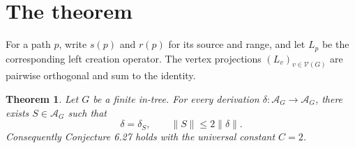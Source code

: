 \documentclass[11pt]{article}
\newtheorem{theorem}{Theorem}
\newcommand{\A}{\mathcal A}
\newcommand{\V}{\mathcal V}
\begin{document}
\section{The theorem}

For a path $p$, write $s(p)$ and $r(p)$ for its source and range, and let
$L_p$ be the corresponding left creation operator.  The vertex projections
$(L_v)_{v\in\V(G)}$ are pairwise orthogonal and sum to the identity.

\begin{theorem}\label{thm:main}
Let $G$ be a finite in-tree.  For every derivation
$\delta:\A_G\to\A_G$, there exists $S\in\A_G$ such that
\[
  \delta=\delta_S,\qquad \|S\|\leq 2\|\delta\|.
\]
Consequently Conjecture 6.27 holds with the universal constant $C=2$.
\end{theorem}
\end{document}
